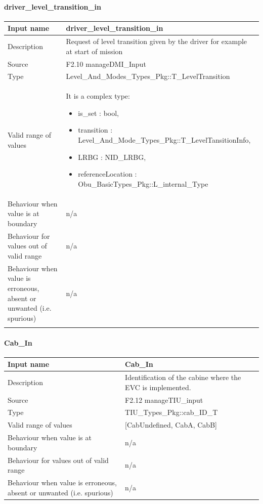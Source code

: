 \paragraph{driver\_level\_transition\_in}

\begin{longtable}{p{}p{}}
\toprule
Input name				& driver\_level\_transition\_in \\
\midrule
Description				& Request of level transition given by the driver for example at start of mission \\
\midrule
Source					& F2.10 manageDMI\_Input \\ 
\midrule
Type					& Level\_And\_Modes\_Types\_Pkg::T\_LevelTransition \\
\midrule
Valid range of values	& It is a complex type:  
\begin{itemize}
\item is\_set : bool,
\item transition : Level\_And\_Mode\_Types\_Pkg::T\_LevelTansitionInfo, 
\item LRBG : NID\_LRBG, 
\item referenceLocation : Obu\_BasicTypes\_Pkg::L\_internal\_Type
\end{itemize} \\
\midrule
Behaviour when value is at boundary	& n/a \\ 
\midrule
Behaviour for values out of valid range	& n/a \\ 
\midrule
Behaviour when value is erroneous, absent or unwanted (i.e. spurious) & n/a \\ 
\bottomrule \\ 
\end{longtable}


\paragraph{Cab\_In}

\begin{longtable}{p{}p{}}
\toprule
Input name				& Cab\_In \\
\midrule
Description				& Identification of the cabine where the EVC is implemented. \\
\midrule
Source					& F2.12 manageTIU\_input \\ 
\midrule
Type					& TIU\_Types\_Pkg::cab\_ID\_T \\
\midrule
Valid range of values	&  [CabUndefined, CabA, CabB] \\
\midrule
Behaviour when value is at boundary	& n/a \\ 
\midrule
Behaviour for values out of valid range	& n/a \\ 
\midrule
Behaviour when value is erroneous, absent or unwanted (i.e. spurious) & n/a \\ 
\bottomrule
\end{longtable}


